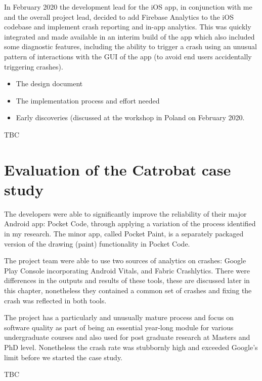 In February 2020 the development lead for the iOS app, in conjunction with me and the overall project lead, decided to add Firebase Analytics to the iOS codebase and implement crash reporting and in-app analytics. This was quickly integrated and made available in an interim build of the app which also included some diagnostic features, including the ability to trigger a crash using an unusual pattern of interactions with the GUI of the app (to avoid end users accidentally triggering crashes).


\begin{itemize}
    \item The design document
    \item The implementation process and effort needed
    \item Early discoveries (discussed at the workshop in Poland on  February 2020.
\end{itemize}
TBC

\section{Evaluation of the Catrobat case study}
The developers were able to significantly improve the reliability of their major Android app: Pocket Code, through applying a variation of the process identified in my research. The minor app, called Pocket Paint, is a separately packaged version of the drawing (paint) functionality in Pocket Code.

The project team were able to use two sources of analytics on crashes: Google Play Console incorporating Android Vitals, and Fabric Crashlytics. There were differences in the outputs and results of these tools, these are discussed later in this chapter, nonetheless they contained a common set of crashes and fixing the crash was reflected in both tools.

The project has a particularly and unusually mature process and focus on software quality as part of being an essential year-long module for various undergraduate courses and also used for post graduate research at Masters and PhD level. Nonetheless the crash rate was stubbornly high and exceeded Google's limit before we started the case study.

TBC

